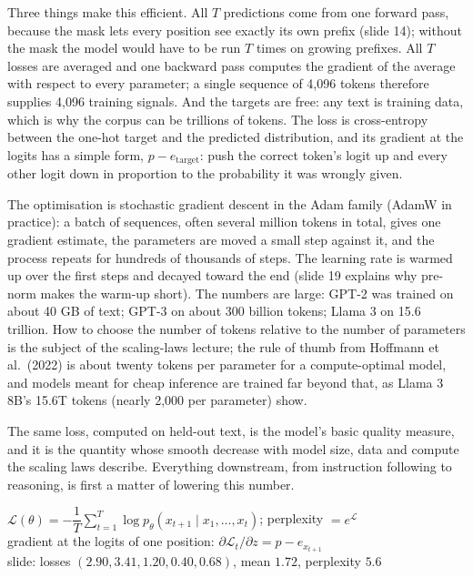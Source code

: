 \documentclass[11pt,letterpaper]{article}
\newenvironment{formulas}{\begin{tcolorbox}[formulabox]}{\end{tcolorbox}}
\begin{document}
Three things make this efficient. All $T$ predictions come from one forward pass, because the mask lets every position see exactly its own prefix (slide 14); without the mask the model would have to be run $T$ times on growing prefixes. All $T$ losses are averaged and one backward pass computes the gradient of the average with respect to every parameter; a single sequence of 4,096 tokens therefore supplies 4,096 training signals. And the targets are free: any text is training data, which is why the corpus can be trillions of tokens. The loss is cross-entropy between the one-hot target and the predicted distribution, and its gradient at the logits has a simple form, $p-e_{\text{target}}$: push the correct token's logit up and every other logit down in proportion to the probability it was wrongly given.

The optimisation is stochastic gradient descent in the Adam family (AdamW in practice): a batch of sequences, often several million tokens in total, gives one gradient estimate, the parameters are moved a small step against it, and the process repeats for hundreds of thousands of steps. The learning rate is warmed up over the first steps and decayed toward the end (slide 19 explains why pre-norm makes the warm-up short). The numbers are large: GPT-2 was trained on about 40 GB of text; GPT-3 on about 300 billion tokens; Llama 3 on 15.6 trillion. How to choose the number of tokens relative to the number of parameters is the subject of the scaling-laws lecture; the rule of thumb from Hoffmann et al.\ (2022) is about twenty tokens per parameter for a compute-optimal model, and models meant for cheap inference are trained far beyond that, as Llama 3 8B's 15.6T tokens (nearly 2,000 per parameter) show.

The same loss, computed on held-out text, is the model's basic quality measure, and it is the quantity whose smooth decrease with model size, data and compute the scaling laws describe. Everything downstream, from instruction following to reasoning, is first a matter of lowering this number.

\begin{formulas}
$\mathcal{L}(\theta)=-\dfrac1T\sum_{t=1}^{T}\log p_\theta(x_{t+1}\mid x_1,\dots,x_t)$; \quad perplexity $=e^{\mathcal{L}}$\\[3pt]
gradient at the logits of one position: $\partial\mathcal{L}_t/\partial z=p-e_{x_{t+1}}$\\[3pt]
slide: losses $(2.90,3.41,1.20,0.40,0.68)$, mean $1.72$, perplexity $5.6$
\end{formulas}
\end{document}
